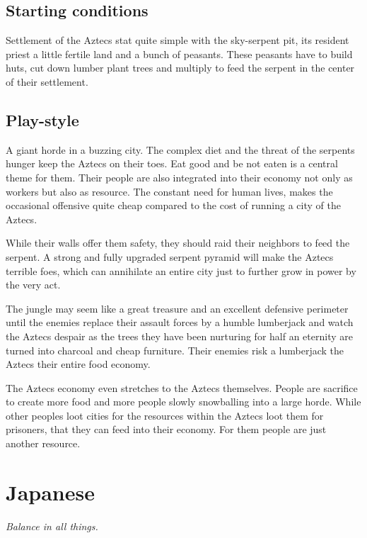 \documentclass[a4paper]{book}
\begin{document}
	\subsection{Starting conditions}
		Settlement of the \gls{Aztecs} stat quite simple with the sky-serpent pit,
		its resident priest a little fertile land and a bunch of peasants.
		These peasants have to build huts, cut down lumber plant trees and multiply
		to feed the serpent in the center of their settlement.

	\subsection{Play-style}
		A giant horde in a buzzing city.
		The complex diet and the threat of the serpents hunger keep the \gls{Aztecs} on their toes.
		Eat good and be not eaten is a central theme for them.
		Their people are also integrated into their economy not only as workers but also as resource.
		The constant need for human lives, makes the occasional offensive quite cheap
		compared to the cost of running a city of the \gls{Aztecs}.

		While their walls offer them safety, they should raid their neighbors to feed the serpent.
		A strong and fully upgraded serpent pyramid will make the \gls{Aztecs} terrible foes,
		which can annihilate an entire city just to further grow in power by the very act.

		The jungle may seem like a great treasure and an excellent defensive perimeter
		until the enemies replace their assault forces by a humble lumberjack
		and watch the \gls{Aztecs} despair as the trees they have been nurturing for half an eternity
		are turned into charcoal and cheap furniture.
		Their enemies risk a lumberjack the \gls{Aztecs} their entire food economy.

		The \gls{Aztecs} economy even stretches to the \gls{Aztecs} themselves.
		People are sacrifice to create more food and more people slowly snowballing into a large horde.
		While other peoples loot cities for the resources within the \gls{Aztecs} loot them
		for prisoners, that they can feed into their economy.
		For them people are just another resource.

\section{\Gls{Japanese}}

	\begin{flushright}
		\emph{Balance in all things.}
	\end{flushright}
\end{document}
